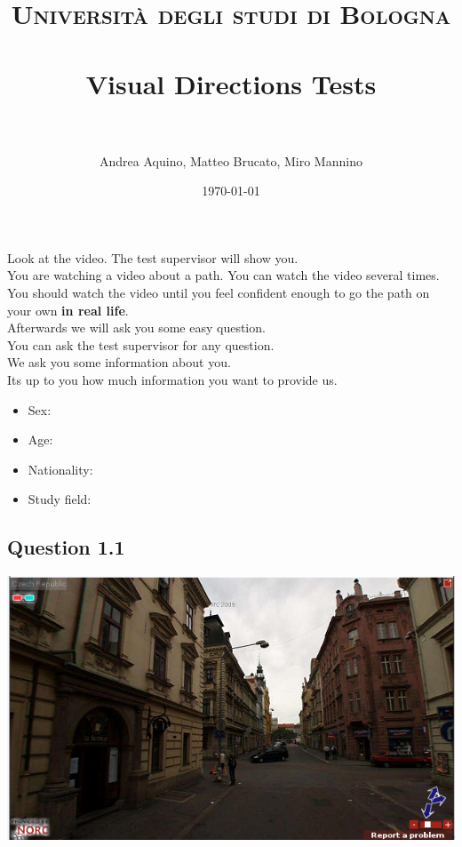 \documentclass[12pt,a4paper,openright, notitlepage]{report}
\title{	
\normalfont \normalsize 
\textsc{Università degli studi di Bologna} \\ [25pt]
\horrule{0.5pt} \\[0.4cm]
\huge Visual Directions Tests \\
\horrule{2pt} \\[0.5cm]
}
\author{Andrea Aquino, Matteo Brucato, Miro Mannino}
\date{\normalsize\today}
\begin{document}
\maketitle


\newpage

Look at the video. The test supervisor will show you. \\
You are watching a video about a path. You can watch the video several times. \\
You should watch the video until you feel confident enough to go the path on your own \textbf{in real life}.  \\
Afterwards we will ask you some easy question. \\
You can ask the test supervisor for any question. \\

We ask you some information about you. \\
Its up to you how much information you want to provide us. \\

\begin{itemize}
	\item Sex: 
	\item Age: 
	\item Nationality:
	\item Study field:
\end{itemize}

	
\newpage

\subsection{Question 1.1}

\includegraphics[width=\textwidth]{imgs/image-question11-1}
\end{document}
